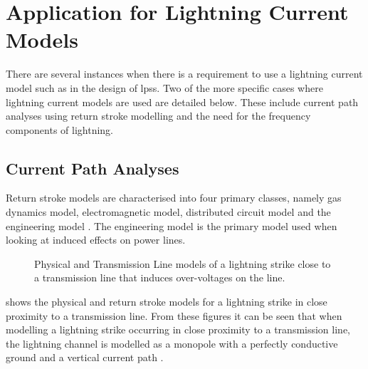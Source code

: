 
\section{Application for Lightning Current Models}
\label{sec:background_applications}
There are several instances when there is a requirement to use a lightning current model such as in the design of \glspl{lps}. Two of the more specific cases where lightning current models are used are detailed below. These include current path analyses using return stroke modelling and the need for the frequency components of lightning.
\subsection{Current Path Analyses}
\label{sub:background_lemp}
Return stroke models are characterised into four primary classes, namely gas dynamics model, electromagnetic model, distributed circuit model and the engineering model \cite{Paolone2009,Rakov2003,Rakov2009}. The engineering model is the primary model used when looking at induced effects on power lines.

\begin{figure}[htbp]
    \centering
    \caption[]{ Physical and  Transmission Line models of a lightning strike close to a transmission line that induces over-voltages on the line.}
    \label{fig:induced_voltage_models}
\end{figure}
 shows the  physical and  return stroke models for a lightning strike in close proximity to a transmission line. From these figures it can be seen that when modelling a lightning strike occurring in close proximity to a transmission line, the lightning channel is modelled as a monopole with a perfectly conductive ground and a vertical current path \cite{Paolone2009,Baba2007,McAfee2015}.

